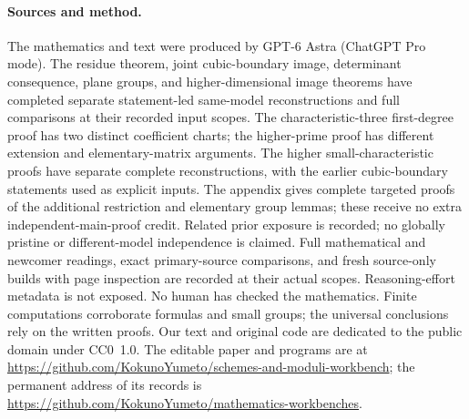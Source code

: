 \documentclass[11pt]{article}
\newcommand{\workbenchurl}{https://github.com/KokunoYumeto/schemes-and-moduli-workbench}
\newcommand{\recordurl}{https://github.com/KokunoYumeto/mathematics-workbenches}
\begin{document}
\paragraph{Sources and method.}
The mathematics and text were produced by GPT-6 Astra (ChatGPT Pro mode). The residue theorem, joint cubic-boundary image, determinant consequence, plane groups, and higher-dimensional image theorems have completed separate statement-led same-model reconstructions and full comparisons at their recorded input scopes. The characteristic-three first-degree proof has two distinct coefficient charts; the higher-prime proof has different extension and elementary-matrix arguments. The higher small-characteristic proofs have separate complete reconstructions, with the earlier cubic-boundary statements used as explicit inputs. The appendix gives complete targeted proofs of the additional restriction and elementary group lemmas; these receive no extra independent-main-proof credit. Related prior exposure is recorded; no globally pristine or different-model independence is claimed. Full mathematical and newcomer readings, exact primary-source comparisons, and fresh source-only builds with page inspection are recorded at their actual scopes. Reasoning-effort metadata is not exposed. No human has checked the mathematics. Finite computations corroborate formulas and small groups; the universal conclusions rely on the written proofs. Our text and original code are dedicated to the public domain under CC0~1.0. The editable paper and programs are at \url{\workbenchurl}; the permanent address of its records is \url{\recordurl}.


\end{document}
